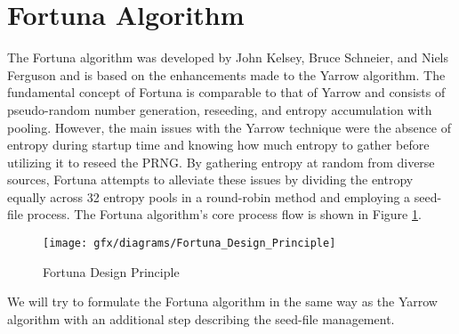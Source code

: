 %
%
\section{Fortuna Algorithm}
\label{sec:SoA:FA}
The Fortuna algorithm was developed by John Kelsey, Bruce Schneier, and Niels Ferguson and is based on the enhancements made to the Yarrow algorithm. The fundamental concept of Fortuna is comparable to that of Yarrow and consists of pseudo-random number generation, reseeding, and entropy accumulation with pooling. However, the main issues with the Yarrow technique were the absence of entropy during startup time and knowing how much entropy to gather before utilizing it to reseed the PRNG. By gathering entropy at random from diverse sources, Fortuna attempts to alleviate these issues by dividing the entropy equally across 32 entropy pools in a round-robin method and employing a seed-file process. The Fortuna algorithm's core process flow is shown in Figure \ref{fig:3:11}.
\begin{figure}[htbp]
	\centering
	\texttt{[image: gfx/diagrams/Fortuna\_Design\_Principle]}
	\caption{Fortuna Design Principle}
	\label{fig:3:11}
\end{figure}

We will try to formulate the Fortuna algorithm in the same way as the Yarrow algorithm with an additional step describing the seed-file management.


